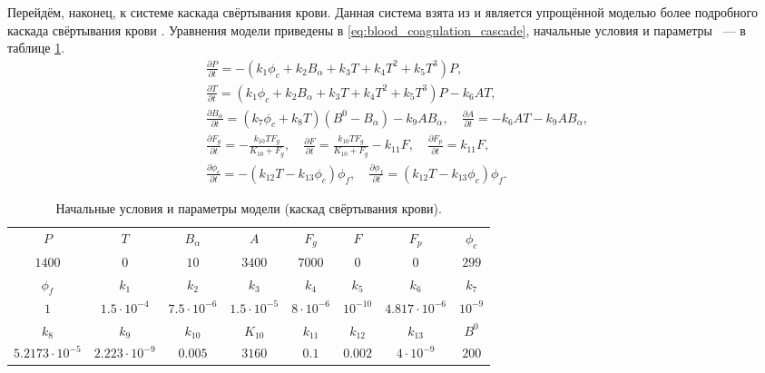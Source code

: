 Перейдём, наконец, к системе каскада свёртывания крови.
Данная система взята из \cite{bouchnita2020mathematical, vassilevski2020parallel}
и является упрощённой моделью более подробного каскада свёртывания крови
\cite{panteleev2008coagulation, ushakova2018gemo}.
Уравнения модели приведены в \eqref{eq:blood_coagulation_cascade}, начальные условия и параметры ~--- в таблице \ref{tab:blood_coagulation_cascade}.
%
\begin{equation}
    \label{eq:blood_coagulation_cascade}
    \begin{aligned}
        \frac{\partial P}{\partial t} = - \left(k_1 \phi_c + k_2 B_\alpha + k_3 T + k_4 T^2 + k_5 T^3\right) P,
        \\
        \frac{\partial T}{\partial t} = \left(k_1 \phi_c + k_2 B_\alpha + k_3 T + k_4 T^2 + k_5 T^3 \right) P - k_6 A T,
        \\
        \frac{\partial B_\alpha}{\partial t} =  \left(k_7 \phi_c + k_8 T \right) \left( B^0 - B_\alpha \right) - k_9 A B_\alpha,
        \quad
        \frac{\partial A}{\partial t} = -k_6 A T - k_9 A B_\alpha,
        \\
        \frac{\partial F_g}{\partial t} = -\frac{k_{10} T F_g}{K_{10} + F_g},
        \quad
        \frac{\partial F}{\partial t} = \frac{k_{10} T F_g}{K_{10} + F_g} - k_{11} F,
        \quad
        \frac{\partial F_p} {\partial t} = k_{11} F,
        \\
        \frac{\partial \phi_c}{\partial t}  = - \left( k_{12} T - k_{13} \phi_c \right) \phi_f,
        \quad
        \frac{\partial \phi_f}{\partial t} = \left( k_{12} T - k_{13} \phi_c \right) \phi_f.
    \end{aligned}
\end{equation}

\begin{table}[ht!]
	\centering
	\begin{tabular}{cccccccc}
		\hline
		$ P $ & $ T $ & $ B_{\alpha} $ & $ A $ & $ F_g $ & $ F $ & $ F_p $ & $ \phi_c $  \\
		$ 1400 $ & $ 0 $ & $ 10 $ & $ 3400 $ & $ 7000 $ & $ 0 $ & $ 0 $ & $ 299 $  \\
		\hline
		 $ \phi_f $ & $ k_1 $ & $ k_2 $ & $ k_3 $ & $ k_4 $ & $ k_5 $ & $ k_6 $ & $ k_7 $   \\
		$ 1 $   & $ 1.5 \cdot 10^{-4} $ & $ 7.5 \cdot 10^{-6} $ & $ 1.5 \cdot 10^{-5} $ & $ 8 \cdot 10^{-6} $ & $ 10^{-10} $ & $ 4.817 \cdot 10^{-6} $ & $ 10^{-9} $ \\
		\hline
		$ k_8 $ & $ k_9 $ & $ k_{10} $ & $ K_{10} $ & $ k_{11} $ & $ k_{12} $ & $ k_{13} $ & $ B^0 $ \\
		 $ 5.2173 \cdot 10^{-5} $  & $ 2.223 \cdot 10^{-9} $ & $ 0.005 $ & $ 3160 $ & $ 0.1 $ & $ 0.002 $ & $ 4 \cdot 10^{-9} $ & $ 200 $ \\
		\hline
	\end{tabular}
    \caption{Начальные условия и параметры модели (каскад свёртывания крови).}
	\label{tab:blood_coagulation_cascade}
\end{table}


